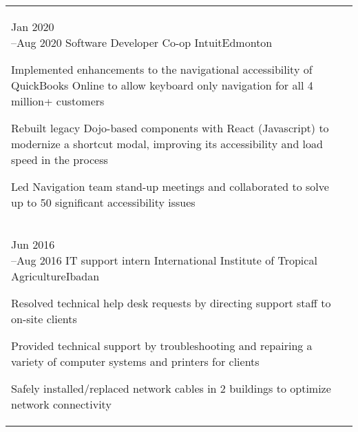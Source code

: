 \documentclass[a4paper]{modernsimplecv}
\begin{document}
\begin{paracol}{2}
\begin{minipage}[t]{\leftcolwidth}
        \begin{tabular}{@{\raggedright}p{} |>{\raggedright\arraybackslash}p{}}
            \cvevent{Jan 2020\newline --Aug 2020}
                {Software Developer Co-op}
                {Intuit}{Edmonton}
                {\begin{tabitemize}
                    \item Implemented enhancements to the navigational accessibility of QuickBooks Online to allow keyboard only navigation for all 4 million+ customers
                    \item Rebuilt legacy Dojo-based components with React (Javascript) to modernize a shortcut modal, improving its accessibility and load speed in the process
                    \item Led Navigation team stand-up meetings and collaborated to solve up to 50 significant accessibility issues
                \end{tabitemize}   
                }\\ 
            \cvevent{Jun 2016\newline --Aug 2016}
                {IT support intern}
                {International Institute of Tropical Agriculture}{Ibadan}
                {\begin{tabitemize}
                    \item Resolved technical help desk requests by directing support staff to on-site clients
                    \item Provided technical support by troubleshooting and repairing a variety of computer systems and printers for clients
                    \item Safely installed/replaced network cables in 2 buildings to optimize network connectivity
                \end{tabitemize}
                \vspace{-\baselineskip}\mbox{}
                }
        \end{tabular}
        \vspace{0pt}

\end{minipage}
\end{paracol}
\end{document}
